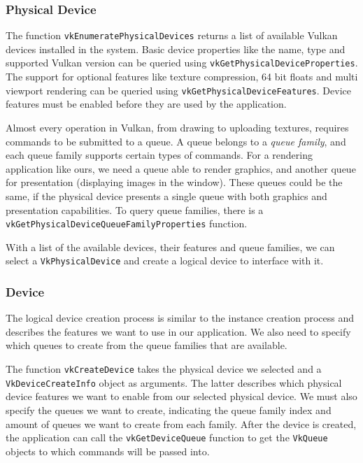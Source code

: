 \subsubsection{Physical Device}
The function \texttt{vkEnumeratePhysicalDevices} returns a list of available Vulkan devices installed in the system. Basic device properties like the name, type and supported Vulkan version can be queried using \texttt{vkGetPhysicalDeviceProperties}. The support for optional features like texture compression, 64 bit floats and multi viewport rendering can be queried using \texttt{vkGetPhysicalDeviceFeatures}. Device features must be enabled before they are used by the application.

Almost every operation in Vulkan, from drawing to uploading textures, requires commands to be submitted to a queue. A queue belongs to a \emph{queue family}, and each queue family supports certain types of commands. For a rendering application like ours, we need a queue able to render graphics, and another queue for presentation (displaying images in the window). These queues could be the same, if the physical device presents a single queue with both graphics and presentation capabilities. To query queue families, there is a \texttt{vkGetPhysicalDeviceQueueFamilyProperties} function.

With a list of the available devices, their features and queue families, we can select a \texttt{VkPhysicalDevice} and create a logical device to interface with it.

\subsubsection{Device}
The logical device creation process is similar to the instance creation process and describes the features we want to use in our application. We also need to specify which queues to create from the queue families that are available.

The function \texttt{vkCreateDevice} takes the physical device we selected and a \texttt{VkDeviceCreateInfo} object as arguments. The latter describes which physical device features we want to enable from our selected physical device. We must also specify the queues we want to create, indicating the queue family index and amount of queues we want to create from each family. After the device is created, the application can call the \texttt{vkGetDeviceQueue} function to get the \texttt{VkQueue} objects to which commands will be passed into.

